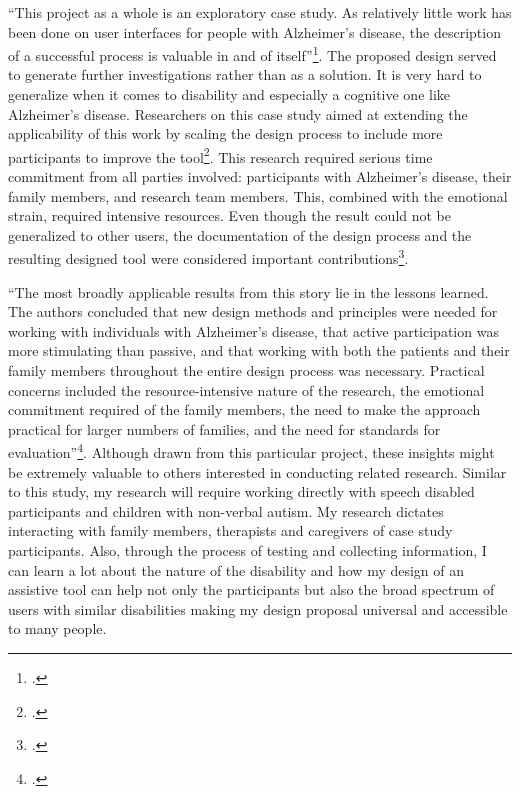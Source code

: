 “This project as a whole is an exploratory case study. As relatively little work has been done on user interfaces for people with Alzheimer’s disease, the description of a successful process is valuable in and of itself”\footcite{Cohene2007}. The proposed design served to generate further investigations rather than as a solution. 
It is very hard to generalize when it comes to disability and especially a cognitive one like Alzheimer’s disease. Researchers on this case study aimed at extending the applicability of this work by scaling the design process to include more participants to improve the tool\footcite{Cohene2007}.
This research required serious time commitment from all parties involved: participants with Alzheimer’s disease, their family members, and research team members. This, combined with the emotional strain, required intensive resources.  Even though the result could not be generalized to other users, the documentation of the design process and the resulting designed tool were considered important contributions\footcite{Cohene2007}.

“The most broadly applicable results from this story lie in the lessons learned. The authors concluded that new design methods and principles were needed for working with individuals with Alzheimer's disease, that active participation was more stimulating than passive, and that working with both the patients and their family members throughout the entire design process was necessary. Practical concerns included the resource-intensive nature of the research, the emotional commitment required of the family members, the need to make the approach practical for larger numbers of families, and the need for standards for evaluation”\footcite{Cohene2007}.
Although drawn from this particular project, these insights might be extremely valuable to others interested in conducting related research.
Similar to this study, my research will require working directly with speech disabled participants and children with non-verbal autism.  My research dictates interacting with family members, therapists and caregivers of case study participants.  Also, through the process of testing and collecting information, I can learn a lot about the nature of the disability and how my design of an assistive tool can help not only the participants but also the broad spectrum of users with similar disabilities making my design proposal universal and accessible to many people.

